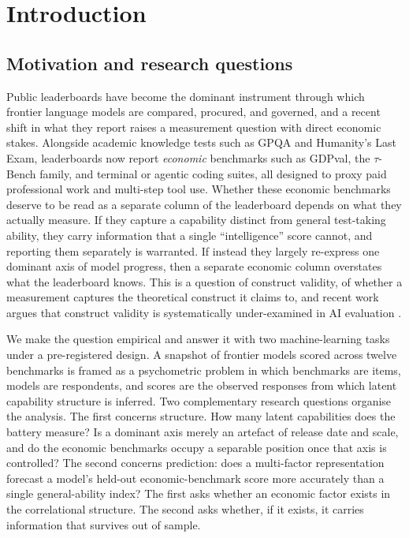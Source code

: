 
\section{Introduction}\label{sec:intro}

\subsection{Motivation and research questions}\label{sec:motivation}
Public leaderboards have become the dominant instrument through which frontier language models are
compared, procured, and governed, and a recent shift in what they report raises a measurement question
with direct economic stakes. Alongside academic knowledge tests such as GPQA and Humanity's Last Exam,
leaderboards now report \emph{economic} benchmarks such as GDPval, the $\tau$-Bench family, and
terminal or agentic coding suites, all designed to proxy paid professional work and multi-step tool use.
Whether these economic benchmarks deserve to be read as a separate column of the leaderboard depends
on what they actually measure. If they capture a capability distinct from general test-taking ability,
they carry information that a single ``intelligence'' score cannot, and reporting them separately is
warranted. If instead they largely re-express one dominant axis of model progress, then a separate
economic column overstates what the leaderboard knows. This is a question of construct validity, of
whether a measurement captures the theoretical construct it claims to, and recent work argues that
construct validity is systematically under-examined in AI evaluation \cite{bean2025,kearns2026}.

We make the question empirical and answer it with two machine-learning tasks under a pre-registered design. A snapshot of frontier models scored across twelve benchmarks is framed as a psychometric problem
in which benchmarks are items, models are respondents, and scores are the observed responses from which
latent capability structure is inferred. Two complementary research questions organise the analysis. The
first concerns structure. How many latent capabilities does the battery measure? Is a dominant axis
merely an artefact of release date and scale, and do the economic benchmarks occupy a separable position
once that axis is controlled? The second concerns prediction: does a multi-factor representation forecast
a model's held-out economic-benchmark score more accurately than a single general-ability index? The
first asks whether an economic factor exists in the correlational structure. The second asks whether, if
it exists, it carries information that survives out of sample.

